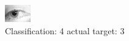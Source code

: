 \begin{figure}[h!]
\begin{center}
\includegraphics[width=0.60\columnwidth]{figures/ID1361_class_4_target_3.png}
\end{center}
\caption{ Classification: 4 actual target: 3}
\label{fig:ID1361_class_4_target_3}
\end{figure}
